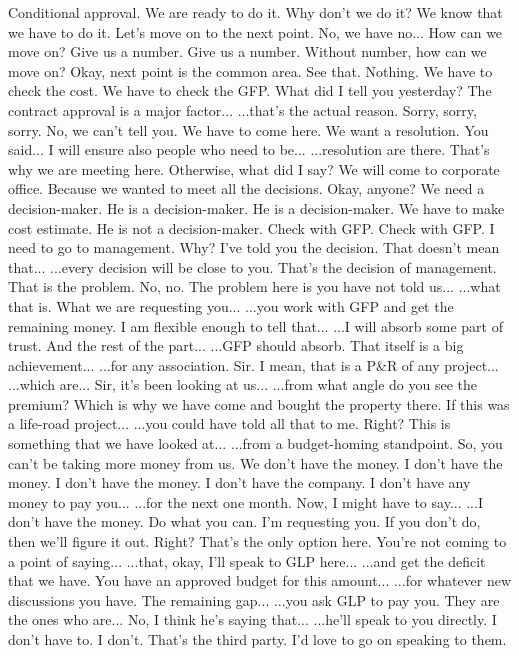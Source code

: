 Conditional approval.
We are ready to do it.
Why don't we do it?
We know that we have to do it.
Let's move on to the next point.
No, we have no...
How can we move on?
Give us a number.
Give us a number.
Without number, how can we move on?
Okay, next point is the common area.
See that.
Nothing.
We have to check the cost.
We have to check the GFP.
What did I tell you yesterday?
The contract approval is a major factor...
...that's the actual reason.
Sorry, sorry, sorry.
No, we can't tell you.
We have to come here.
We want a resolution.
You said...
I will ensure also people who need to be...
...resolution are there.
That's why we are meeting here.
Otherwise, what did I say?
We will come to corporate office.
Because we wanted to meet all the decisions.
Okay, anyone?
We need a decision-maker.
He is a decision-maker.
He is a decision-maker.
We have to make cost estimate.
He is not a decision-maker.
Check with GFP.
Check with GFP.
I need to go to management.
Why?
I've told you the decision.
That doesn't mean that...
...every decision will be close to you.
That's the decision of management.
That is the problem.
No, no.
The problem here is you have not told us...
...what that is.
What we are requesting you...
...you work with GFP and get the remaining money.
I am flexible enough to tell that...
...I will absorb some part of trust.
And the rest of the part...
...GFP should absorb.
That itself is a big achievement...
...for any association.
Sir.
I mean, that is a P\&R of any project...
...which are...
Sir, it's been looking at us...
...from what angle do you see the premium?
Which is why we have come and bought the property there.
If this was a life-road project...
...you could have told all that to me.
Right?
This is something that we have looked at...
...from a budget-homing standpoint.
So, you can't be taking more money from us.
We don't have the money.
I don't have the money.
I don't have the money.
I don't have the company.
I don't have any money to pay you...
...for the next one month.
Now, I might have to say...
...I don't have the money.
Do what you can.
I'm requesting you.
If you don't do, then we'll figure it out.
Right?
That's the only option here.
You're not coming to a point of saying...
...that, okay, I'll speak to GLP here...
...and get the deficit that we have.
You have an approved budget for this amount...
...for whatever new discussions you have.
The remaining gap...
...you ask GLP to pay you.
They are the ones who are...
No, I think he's saying that...
...he'll speak to you directly.
I don't have to.
I don't.
That's the third party.
I'd love to go on speaking to them.
